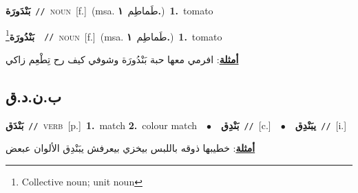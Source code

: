\documentclass[10pt,a4paper,twoside]{article} %
\begin{document}
\begin{multicols}{2}
{\setlength\topsep{0pt}\textbf{\foreignlanguage{arabic}{بَنْدَورَة}}\ {\color{gray}\texttt{//}\color{black}}\ \textsc{noun}\ [f.]\ \color{gray}(msa. \foreignlanguage{arabic}{طَماطِم}~\foreignlanguage{arabic}{\textbf{١.}})\color{black}\ \textbf{1.}~tomato\ } \vspace{2mm}

{\setlength\topsep{0pt}\textbf{\foreignlanguage{arabic}{بَنْدُورَة}}\footnote{Collective noun; unit noun}\ \ {\color{gray}\texttt{//}\color{black}}\ \textsc{noun}\ [f.]\ \color{gray}(msa. \foreignlanguage{arabic}{طَماطِم}~\foreignlanguage{arabic}{\textbf{١.}})\color{black}\ \textbf{1.}~tomato\  \begin{flushright}\color{gray}\foreignlanguage{arabic}{\textbf{\underline{\foreignlanguage{arabic}{أمثلة}}}: افرمي معها حبة بَنْدُورَة وشوفي كيف رح تِطْعِم زاكي}\end{flushright}\color{black}} \vspace{2mm}

\vspace{-3mm}
\subsection*{\color{blue}\foreignlanguage{arabic}{ب.ن.د.ق}\color{blue}{}} 

{\setlength\topsep{0pt}\textbf{\foreignlanguage{arabic}{بَنْدَق}}\ {\color{gray}\texttt{//}\color{black}}\ \textsc{verb}\ [p.]\ \textbf{1.}~match  \textbf{2.}~colour match\ \ $\bullet$\ \ \setlength\topsep{0pt}\textbf{\foreignlanguage{arabic}{بَنْدِق}}\ {\color{gray}\texttt{//}\color{black}}\ [c.]\ \ $\bullet$\ \ \setlength\topsep{0pt}\textbf{\foreignlanguage{arabic}{يبَنْدِق}}\ {\color{gray}\texttt{//}\color{black}}\ [i.]\  \begin{flushright}\color{gray}\foreignlanguage{arabic}{\textbf{\underline{\foreignlanguage{arabic}{أمثلة}}}: خطيبها ذوقه باللبس بيخزي بيعرفش يبَنْدِق الألوان عبعض}\end{flushright}\color{black}} \vspace{2mm}


\end{multicols}
\end{document}
